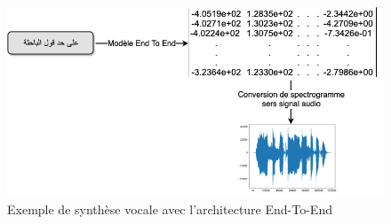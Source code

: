 \begin{figure}[H]
    \centering
    \includegraphics[width=400pt]{images/chap1/Exemple_Synthese_E2E.png}
    \caption{Exemple de synthèse vocale avec l'architecture End-To-End}
    \label{exempleSyntheseVoc}
\end{figure}
